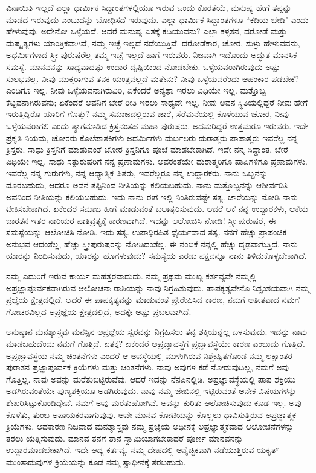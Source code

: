 ವಿನಾಯಿತಿ ಇಲ್ಲದೆ ಎಲ್ಲಾ ಧಾರ್ಮಿಕ ಸಿದ್ದಾಂತಗಳಲ್ಲಿಯೂ ಇರುವ ಒಂದು ಕೊರತೆಯೆ, ಮನುಷ್ಯ ಹೇಗೆ ತಪ್ಪನ್ನು ಮಾಡದೆ ಇರುವುದು ಎಂಬುದನ್ನು ಬೋಧಿಸದೆ ಇರುವುದು. ಎಲ್ಲಾ ಧಾರ್ಮಿಕ ಸಿದ್ದಾಂತಗಳೂ “ಕದಿಯ ಬೇಡಿ" ಎಂದು ಹೇಳುವುವು. ಅದೇನೋ ಒಳ್ಳೆಯದೆ. ಆದರೆ ಮನುಷ್ಯ ಏತಕ್ಕೆ ಕದಿಯುವನು? ಎಲ್ಲಾ ಕಳ್ಳತನ, ದರೋಡೆ ಮತ್ತು ದುಷ್ಕೃತ್ಯಗಳು ಯಾಂತ್ರಿಕವಾಗಿವೆ, ನಮ್ಮ ಇಚ್ಛೆ ಇಲ್ಲದೆ ನಡೆಯುತ್ತಿವೆ. ದರೋಡೆಕಾರ, ಚೋರ, ಸುಳ್ಳು ಹೇಳುವವನು, ಅಧರ್ಮಿಗಳಾದ ಸ್ತ್ರೀ ಪುರುಷರೆಲ್ಲ ತಮ್ಮ ಇಚ್ಛೆ ಇಲ್ಲದೆ ಹಾಗೆ ಇರುವರು. ನಿಜವಾಗಿ ಇದೊಂದು ಅದ್ಭುತ ಮಾನಸಿಕ ಸಮಸ್ಯೆ. ಮಾನವನನ್ನು ಸಾಧ್ಯವಾದಷ್ಟು ಉದಾರ ದೃಷ್ಟಿಯಿಂದ ನೋಡಬೇಕು. ಒಳ್ಳೆಯವರಾಗಿರುವುದು ಅಷ್ಟು ಸುಲಭವಲ್ಲ. ನೀವು ಮುಕ್ತರಾಗುವ ತನಕ ಯಂತ್ರವಲ್ಲದೆ ಮತ್ತೇನು? ನೀವು ಒಳ್ಳೆಯವರೆಂದು ಅಹಂಕಾರ ಪಡಬೇಕೆ? ಎಂದಿಗೂ ಇಲ್ಲ. ನೀವು ಒಳ್ಳೆಯವನಾಗಿರುವಿರಿ, ಏಕೆಂದರೆ ಅನ್ಯಥಾ ಇರಲು ವಿಧಿಯೇ ಇಲ್ಲ. ಮತ್ತೊಬ್ಬ ಕೆಟ್ಟವನಾಗಿರುವನು; ಏಕೆಂದರೆ ಅವನಿಗೆ ಬೇರೆ ರೀತಿ ಇರಲು ಸಾಧ್ಯವೇ ಇಲ್ಲ. ನೀವು ಅವನ ಸ್ಥಿತಿಯಲ್ಲಿದ್ದರೆ ನೀವು ಹೇಗೆ ಇರುತ್ತಿದ್ದಿರೊ ಯಾರಿಗೆ ಗೊತ್ತು? ನಮ್ಮ ಸಮಾಜದಲ್ಲಿರುವ ಜಾರೆ, ಸೆರೆಮನೆಯಲ್ಲಿ ಕೊಳೆಯುವ ಚೋರ, ನೀವು ಒಳ್ಳೆಯವರಾಗಲಿ ಎಂದು ತ್ಯಾಗಮಾಡಿದ ಕ್ರಿಸ್ತನಂತಹ ಮಹಾ ಪುರುಷರು. ಅಧಮರಿದ್ದರೆ ಉತ್ತಮರೂ ಇರುವರು. ಇದೇ ಪ್ರಕೃತಿ ನಿಯಮ, ಚೋರರು ಕೊಲೆಪಾತಕಿಗಳು ಅಧರ್ಮಿಗಳು ದುರ್ಬಲರು ದುರಾತ್ಮರು ಪಾಪಾತ್ಮರು ಇವರೆಲ್ಲ ನನ್ನ ಕ್ರಿಸ್ತರು. ಸಾಧು ಕ್ರಿಸ್ತನಿಗೆ ಮಾಡುವಂತೆ ಚೋರ ಕ್ರಿಸ್ತನಿಗೂ ಪೂಜೆ ಮಾಡಬೇಕಾಗಿದೆ. ಇದೇ ನನ್ನ ಸಿದ್ದಾಂತ, ಬೇರೆ ವಿಧಿಯೇ ಇಲ್ಲ. ಸಾಧು ಸತ್ಪುರುಷರಿಗೆ ನನ್ನ ಪ್ರಣಾಮಗಳು. ಅವರಂತೆಯೇ ದುರಾತ್ಮರಿಗೂ ಪಾಪಿಗಳಿಗೂ ಪ್ರಣಾಮಗಳು. ಇವರೆಲ್ಲ ನನ್ನ ಗುರುಗಳು, ನನ್ನ ಆಧ್ಯಾತ್ಮಿಕ ಪಿತರು, ಇವರೆಲ್ಲರೂ ನನ್ನ ಉದ್ದಾರಕರು. ನಾನು ಒಬ್ಬನನ್ನು ದೂರಬಹುದು, ಆದರೂ ಅವನ ತಪ್ಪಿನಿಂದ ನೀತಿಯನ್ನು ಕಲಿಯಬಹುದು. ನಾನು ಮತ್ತೊಬ್ಬನನ್ನು ಆಶೀರ್ವದಿಸಿ ಅವನಿಂದ ನೀತಿಯನ್ನು ಕಲಿಯಬಹುದು. ಇದು ನಾನು ಈಗ ಇಲ್ಲಿ ನಿಂತಿರುವಷ್ಟೇ ಸತ್ಯ. ಜಾರೆಯನ್ನು ನೋಡಿ ನಾನು ಟೀಕಿಸಬೇಕಾಗಿದೆ. ಏಕೆಂದರೆ ಸಮಾಜ ಹೀಗೆ ಮಾಡುವಂತೆ ಬಲಾತ್ಕರಿಸುವುದು. ಆದರೆ ಆಕೆ ನನ್ನ ಉದ್ದಾರಕಳು, ಆಕೆಯ ಜಾರತನ ಇತರ ನಾರಿಯರ ಪಾತಿವ್ರತ್ಯಕ್ಕೆ ಕಾರಣವಾಗಿದೆ. ಇದನ್ನು ಆಲೋಚಿಸಿ ನೋಡಿ! ಸ್ತ್ರೀ ಪುರುಷರೆ, ಈ ಸಮಸ್ಯೆಯನ್ನು ಆಲೋಚಿಸಿ ನೋಡಿ. ಇದು ಸತ್ಯ. ಉಪಾಧಿರಹಿತ ಧೈರ್ಯವಾದ ಸತ್ಯ. ನನಗೆ ಹೆಚ್ಚು ಪ್ರಾಪಂಚಿಕ ಅನುಭವ ಆದಂತೆಲ್ಲ, ಹೆಚ್ಚು ಸ್ತ್ರೀಪುರುಷರನ್ನು ನೋಡಿದಂತೆಲ್ಲ, ಈ ನಂಬಿಕೆ ನನ್ನಲ್ಲಿ ಹೆಚ್ಚು ದೃಢವಾಗುತ್ತಿದೆ. ನಾನು ಯಾರನ್ನು ನಿಂದಿಸುವುದು, ಯಾರನ್ನು ಹೊಗಳುವುದು? ಸಮಸ್ಯೆಯ ಎರಡು ಪಕ್ಷವನ್ನೂ ನಾನು ತಿಳಿದುಕೊಳ್ಳಬೇಕಾಗಿದೆ.

ನಮ್ಮ ಎದುರಿಗೆ ಇರುವ ಕಾರ್ಯ ಮಹತ್ತರವಾದುದು. ನಮ್ಮ ಪ್ರಥಮ ಮುಖ್ಯ ಕರ್ತವ್ಯವೇ ನಮ್ಮಲ್ಲಿ ಅಪ್ರಜ್ಞಾಪೂರ್ವಕವಾಗಿರುವ ಆಲೋಚನಾ ರಾಶಿಯನ್ನು ನಾವು ನಿಗ್ರಹಿಸುವುದು. ಪಾಪಕೃತ್ಯವೇನೊ ನಿಸ್ಸಂಶಯವಾಗಿ ನಮ್ಮ ಪ್ರಜ್ಞೆಯ ಕ್ಷೇತ್ರದಲ್ಲಿದೆ. ಆದರೆ ಈ ಪಾಪಕೃತ್ಯವನ್ನು ಮಾಡುವಂತೆ ಪ್ರೇರೇಪಿಸಿದ ಕಾರಣ, ನಮಗೆ ಅತೀತವಾದ ನಮಗೆ ಗೋಚರವಿಲ್ಲದ ಅಪ್ರಜ್ಞೆಯ ಕ್ಷೇತ್ರದಲ್ಲಿದೆ, ಅದಕ್ಕೇ ಅಷ್ಟು ಪ್ರಬಲವಾಗಿದೆ.

ಅನುಷ್ಠಾನ ಮನಶ್ಶಾಸ್ತ್ರವು ಮನಸ್ಸಿನ ಅಪ್ರಜ್ಞೆಯ ಸ್ವರವನ್ನು ನಿಗ್ರಹಿಸಲು ತನ್ನ ಶಕ್ತಿಯನ್ನೆಲ್ಲ ಬಳಸುವುದು. ಇದನ್ನು ನಾವು ಮಾಡಬಹುದೆಂದು ನಮಗೆ ಗೊತ್ತಿದೆ. ಏತಕ್ಕೆ? ಏಕೆಂದರೆ ಅಪ್ರಜ್ಞಾವಸ್ಥೆಗೆ ಪ್ರಜ್ಞಾವಸ್ಥೆಯೇ ಕಾರಣ ಎಂಬುದು ಗೊತ್ತಿದೆ. ಅಪ್ರಜ್ಞಾವಸ್ಥೆಯ ನಮ್ಮ ಚಿಂತನೆಗಳು ಎಂದರೆ ಆ ಅವಸ್ಥೆಯಲ್ಲಿ ಮುಳುಗಿರುವ ನಿಶ್ಚೇಷ್ಟಿತಗೊಂಡ ನಮ್ಮ ಲಕ್ಷಾಂತರ ಪುರಾತನ ಪ್ರಜ್ಞಾಪೂರ್ವಕ ಕ್ರಿಯೆಗಳು ಮತ್ತು ಚಿಂತನೆಗಳು. ನಾವು ಅವುಗಳ ಕಡೆ ನೋಡುವುದಿಲ್ಲ, ನಮಗೆ ಅವು ಗೊತ್ತಿಲ್ಲ. ನಾವು ಅವನ್ನು ಮರೆತುಬಿಟ್ಟಿರುವೆವು. ಆದರೆ ಇದನ್ನು ನೆನಪಿನಲ್ಲಿಡಿ. ಅಪ್ರಜ್ಞಾವಸ್ಥೆಯಲ್ಲಿ ಪಾಪ ಶಕ್ತಿಯು ಅಡಗಿರುವಂತೆಯೇ ಪುಣ್ಯಶಕ್ತಿಯೂ ಅಡಗಿರುವುದು. ನಾವು ನಮ್ಮ ಜೇಬಿನಲ್ಲಿ ಇಟ್ಟಿರುವಂತೆ ಅನೇಕ ವಿಷಯಗಳನ್ನು ಶೇಖರಿಸಿಟ್ಟುಕೊಂಡಿದ್ದೇವೆ. ನಮಗೆ ಅವು ಮರೆತುಹೋಗಿವೆ. ಅವನ್ನು ಕುರಿತು ಆಲೋಚಿಸುವುದು ಕೂಡ ಇಲ್ಲ. ಅವು ಕೊಳೆತು, ತುಂಬ ಅಪಾಯಕರವಾಗುವುವು. ಅವೇ ಮಾನವ ಕೋಟಿಯನ್ನು ಕೊಲ್ಲಲು ಧಾವಿಸುತ್ತಿರುವ ಅಪ್ರಜ್ಞಾತ್ಮಕ ಕ್ರಿಯೆಗಳು. ಆದಕಾರಣ ನಿಜವಾದ ಮನಶ್ಶಾಸ್ತ್ರವು ನಮ್ಮ ಪ್ರಜ್ಞೆಯ ಅಧೀನಕ್ಕೆ ಅಪ್ರಜ್ಞಾತ್ಮಕವಾದ ಆಲೋಚನೆಗಳನ್ನು ತರಲು ಯತ್ನಿಸುವುದು. ಮಾನವ ತನಗೆ ತಾನೆ ಸ್ವಾಮಿಯಾಗಬೇಕಾದರೆ ಪೂರ್ಣ ಮಾನವನನ್ನು ಉದ್ಧಾರಮಾಡಬೇಕಾಗಿದೆ. ಇದೇ ಆದ್ಯ ಕರ್ತವ್ಯ. ನಮ್ಮ ದೇಹದಲ್ಲಿ ಅನೈಚ್ಛಿಕವಾಗಿ ನಡೆಯುತ್ತಿರುವ ಯಕೃತ್ ಮುಂತಾದುವುಗಳ ಕ್ರಿಯೆಯನ್ನು ಕೂಡ ನಮ್ಮ ಸ್ವಾಧೀನಕ್ಕೆ ತರಬಹುದು.


